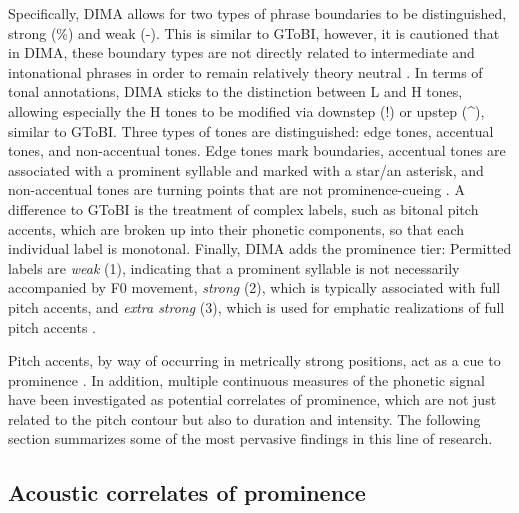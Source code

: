 Specifically, DIMA allows for two types of phrase boundaries to be distinguished, strong (\%) and weak (-). This is similar to GToBI, however, it is cautioned that in DIMA, these boundary types are not directly related to intermediate and intonational phrases in order to remain relatively theory neutral \citep[29]{kuglerDeutscheIntonationModellierung2022}. In terms of tonal annotations, DIMA sticks to the distinction between L and H tones,  allowing especially the H tones to be modified via downstep (!) or upstep (\textasciicircum), similar to GToBI. Three types of tones are distinguished: edge tones, accentual tones, and non-accentual tones. Edge tones mark boundaries, accentual tones are associated with a prominent syllable and marked with a star/an asterisk, and non-accentual tones are turning points that are not prominence-cueing \citep[38]{kuglerDeutscheIntonationModellierung2022}. A difference to GToBI is the treatment of complex labels, such as bitonal pitch accents, which are broken up into their phonetic components, so that each individual label is monotonal. Finally, DIMA adds the prominence tier: Permitted labels are \textit{weak} (1), indicating that a prominent syllable is not necessarily accompanied by F0 movement, \textit{strong} (2), which is typically associated with full pitch accents, and \textit{extra strong} (3), which is used for emphatic realizations of full pitch accents \citep[34]{kuglerDeutscheIntonationModellierung2022}.

Pitch accents, by way of occurring in metrically strong positions, act as a cue to prominence \citep[54]{laddIntonationalPhonology2008}. In addition, multiple continuous measures of the phonetic signal have been investigated as potential correlates of prominence, which are not just related to the pitch contour but also to duration and intensity. The following section summarizes some of the most pervasive findings in this line of research.

\subsection{Acoustic correlates of prominence} \label{section: acoustics}

